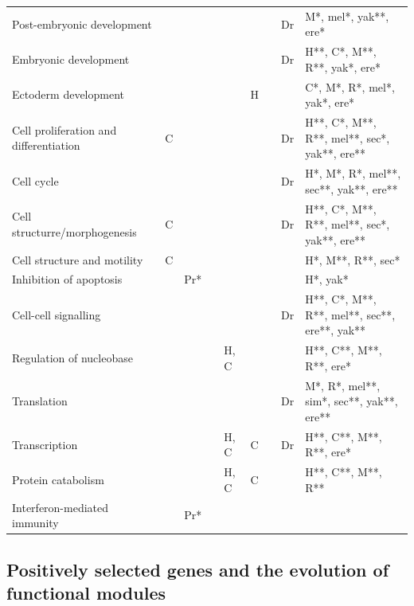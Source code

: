 \begin{FPtable}
{\begin{tabular}{ p{8.5cm} p{0.8cm} p{0.8cm} p{0.5cm} p{0.8cm} p{0.5cm} p{0.85cm} p{0.5cm} p{8cm}}
  Post-embryonic development &  &  &  &  &  &  & Dr & M*, mel*, yak**, ere* \\
  Embryonic development &  &  &  &  &  &  & Dr & H**, C*, M**, R**, yak*, ere* \\
  Ectoderm development &  &  &  &  & H &  &  & C*, M*, R*, mel*, yak*, ere* \\
  Cell proliferation and differentiation & C &  &  &  &  &  & Dr & H**, C*, M**, R**, mel**, sec*, yak**, ere** \\
  Cell cycle &  &  &  &  &  &  & Dr & H*, M*, R*, mel**, sec**, yak**, ere** \\
  Cell structurre/morphogenesis & C &  &  &  &  &  & Dr & H**, C*, M**, R**, mel**, sec*, yak**, ere** \\
  Cell structure and motility & C &  &  &  &  &  &  & H*, M**, R**, sec* \\
  Inhibition of apoptosis &  & Pr* &  &  &  &  &  & H*, yak* \\
  Cell-cell signalling &  &  &  &  &  &  & Dr & H**, C*, M**, R**, mel**, sec**, ere**, yak** \\
  Regulation of nucleobase &  &  &  & H, C &  &  &  & H**, C**, M**, R**, ere* \\
  Translation &  &  &  &  &  &  & Dr & M*, R*, mel**, sim*, sec**, yak**, ere** \\
  Transcription &  &  &  & H, C & C &  & Dr & H**, C**, M**, R**, ere* \\
  Protein catabolism &  &  &  & H, C & C &  &  & H**, C**, M**, R** \\
  Interferon-mediated immunity &  & Pr* &  &  &  &  &  &  \\ \hline
  \end{tabular}
}
\label{tab:gssa_compare}
\end{FPtable}

\subsection{Positively selected genes and the evolution of functional modules}

